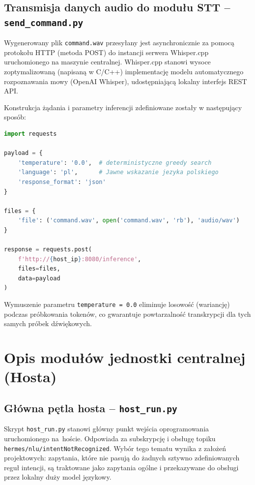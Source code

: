 \documentclass[12pt,a4paper]{article}
\begin{document}
\subsection{Transmisja danych audio do modułu STT – \texttt{send\_command.py}}
Wygenerowany plik \texttt{command.wav} przesyłany jest asynchronicznie za pomocą protokołu HTTP (metoda POST) do instancji serwera Whisper.cpp uruchomionego na maszynie centralnej. Whisper.cpp stanowi wysoce zoptymalizowaną (napisaną w C/C++) implementację modelu automatycznego rozpoznawania mowy (OpenAI Whisper), udostępniającą lokalny interfejs REST API.

\smallbreak

Konstrukcja żądania i parametry inferencji zdefiniowane zostały w następujący sposób:

\begin{center}
\begin{minipage}{0.85\textwidth}
\begin{lstlisting}[language=Python]
import requests

payload = {
    'temperature': '0.0',  # deterministyczne greedy search
    'language': 'pl',      # Jawne wskazanie jezyka polskiego 
    'response_format': 'json'
}

files = {
    'file': ('command.wav', open('command.wav', 'rb'), 'audio/wav')
}

response = requests.post(
    f'http://{host_ip}:8080/inference',
    files=files, 
    data=payload
)
\end{lstlisting}
\end{minipage}
\end{center}

Wymuszenie parametru \texttt{temperature = 0.0} eliminuje losowość (wariancję) podczas próbkowania tokenów, co gwarantuje powtarzalność transkrypcji dla tych samych próbek dźwiękowych.

\section{Opis modułów jednostki centralnej (Hosta)}

\subsection{Główna pętla hosta – \texttt{host\_run.py}}
Skrypt \texttt{host\_run.py} stanowi główny punkt wejścia oprogramowania uruchomionego na~hoście. Odpowiada za subskrypcję i obsługę topiku \texttt{hermes/nlu/intentNotRecognized}. Wybór tego tematu wynika z założeń projektowych: zapytania, które nie pasują do żadnych sztywno zdefiniowanych reguł intencji, są traktowane jako zapytania ogólne i przekazywane do obsługi przez lokalny duży model językowy.
\end{document}
